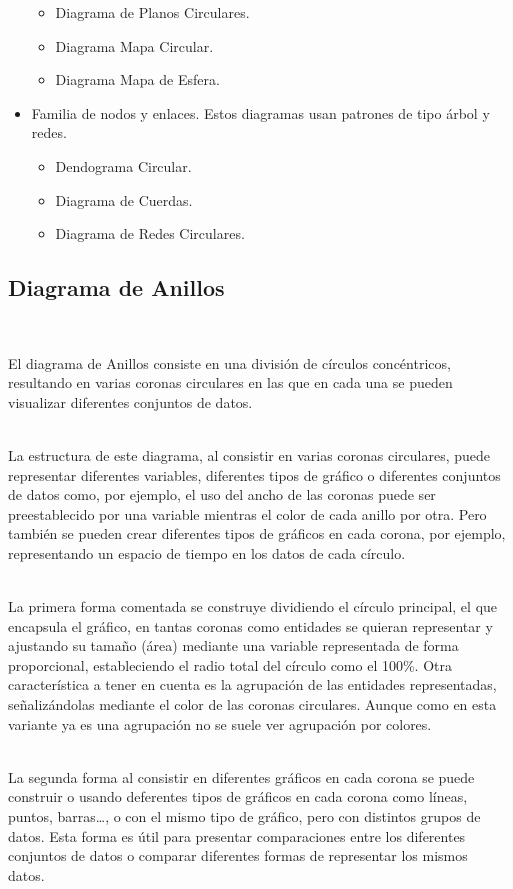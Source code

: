 \documentclass{article}\usepackage[]{graphicx}\usepackage[]{color}
\begin{document}
\begin{itemize}
\begin{itemize}
  \item Diagrama de Planos Circulares.
  \item Diagrama Mapa Circular.
  \item Diagrama Mapa de Esfera.
\end{itemize}
\item Familia de nodos y enlaces. Estos diagramas usan patrones de tipo \'arbol y redes.
\begin{itemize}
  \item Dendograma Circular.
  \item Diagrama de Cuerdas.
  \item Diagrama de Redes Circulares.
\end{itemize}
\end{itemize}
\subsection{Diagrama de Anillos}~\par
El diagrama de Anillos consiste en una divisi\'on de c\'irculos conc\'entricos, resultando en varias coronas circulares en las que en cada una se pueden visualizar diferentes conjuntos de datos.~\\~\par
La estructura de este diagrama, al consistir en varias coronas circulares, puede representar diferentes variables, diferentes tipos de gr\'afico o diferentes conjuntos de datos como, por ejemplo, el uso del ancho de las coronas puede ser preestablecido por una variable mientras el color de cada anillo por otra. Pero tambi\'en se pueden crear diferentes tipos de gr\'aficos en cada corona, por ejemplo, representando un espacio de tiempo en los datos de cada c\'irculo.~\\~\par
La primera forma comentada se construye dividiendo el c\'irculo principal, el que encapsula el gr\'afico, en tantas coronas como entidades se quieran representar y ajustando su tama\~no (\'area)  mediante una variable representada de forma proporcional, estableciendo el radio total del c\'irculo como el 100\%. Otra caracter\'istica a tener en cuenta es la agrupaci\'on de las entidades representadas, se\~naliz\'andolas mediante el color de las coronas circulares. Aunque como en esta variante ya es una agrupaci\'on\cite{Jax_de_leon} no se suele ver agrupaci\'on por colores.~\\~\par
La segunda forma al consistir en diferentes gr\'aficos en cada corona se puede construir o usando deferentes tipos de gr\'aficos en cada corona como l\'ineas, puntos, barras…, o con el mismo tipo de gr\'afico, pero con distintos grupos de datos. Esta forma es \'util para presentar comparaciones entre los diferentes conjuntos de datos\cite[Figura 1-F]{genoma} o comparar diferentes formas de representar los mismos datos\cite{cultivation}.~\\~\par
\end{document}
